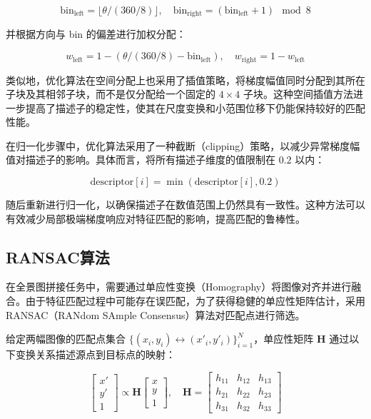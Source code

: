 \documentclass[a4paper, utf8]{ctexart}
\begin{document}
	\vspace{-1em}
	\begin{equation}
	\text{bin}_{\text{left}} = \lfloor \theta / (360/8) \rfloor, \quad \text{bin}_{\text{right}} = (\text{bin}_{\text{left}} + 1) \mod 8
	\end{equation}
	
	并根据方向与 bin 的偏差进行加权分配：
	
	\vspace{-1em}
	\begin{equation}
	w_{\text{left}} = 1 - (\theta / (360/8) - \text{bin}_{\text{left}}), \quad w_{\text{right}} = 1 - w_{\text{left}}
	\end{equation}
	
	类似地，优化算法在空间分配上也采用了插值策略，将梯度幅值同时分配到其所在子块及其相邻子块，而不是仅分配给一个固定的 $4 \times 4$ 子块。这种空间插值方法进一步提高了描述子的稳定性，使其在尺度变换和小范围位移下仍能保持较好的匹配性能。
	
	在归一化步骤中，优化算法采用了一种截断（clipping）策略，以减少异常梯度幅值对描述子的影响。具体而言，将所有描述子维度的值限制在 $0.2$ 以内：
	
	\vspace{-1em}
	\begin{equation}
	\text{descriptor}[i] = \min(\text{descriptor}[i], 0.2)
	\end{equation}
	
	随后重新进行归一化，以确保描述子在数值范围上仍然具有一致性。这种方法可以有效减少局部极端梯度响应对特征匹配的影响，提高匹配的鲁棒性。
	
	\subsection{RANSAC算法}
	
	在全景图拼接任务中，需要通过单应性变换（Homography）将图像对齐并进行融合。由于特征匹配过程中可能存在误匹配，为了获得稳健的单应性矩阵估计，采用 RANSAC（RANdom SAmple Consensus）算法对匹配点进行筛选。
	
	给定两幅图像的匹配点集合 $\{ (x_i, y_i) \leftrightarrow (x'_i, y'_i) \}_{i=1}^{N}$，单应性矩阵 $\mathbf{H}$ 通过以下变换关系描述源点到目标点的映射：
	
	\vspace{-.5em}
	\begin{equation}
	    \begin{bmatrix} x' \\ y' \\ 1 \end{bmatrix} \propto 
	    \mathbf{H} \begin{bmatrix} x \\ y \\ 1 \end{bmatrix},
	    \quad \mathbf{H} = 
	    \begin{bmatrix} h_{11} & h_{12} & h_{13} \\
	                    h_{21} & h_{22} & h_{23} \\
	                    h_{31} & h_{32} & h_{33} \end{bmatrix}
	\end{equation}
	
\end{document}
